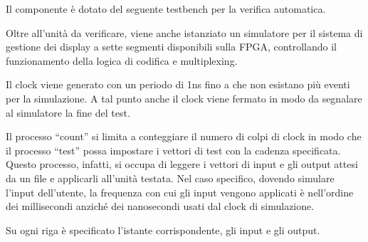 \documentclass [11pt,a4paper,oneside,draft]{article}
\begin{document}
Il componente è dotato del seguente testbench per la verifica automatica.



Oltre all'unità da verificare, viene anche istanziato un simulatore per il
sistema di gestione dei display a sette segmenti disponibili sulla FPGA,
controllando il funzionamento della logica di codifica e multiplexing.

Il clock viene generato con un periodo di 1ns fino a che non esistano più
eventi per la simulazione. A tal punto anche il clock viene fermato in 
modo da segnalare al simulatore la fine del test.

Il processo ``count'' si limita a conteggiare il numero di colpi di clock
in modo che il processo ``test'' possa impostare i vettori di test con 
la cadenza specificata. Questo processo, infatti, si occupa di leggere
i vettori di input e gli output attesi da un file e applicarli all'unità
testata. Nel caso specifico, dovendo simulare l'input dell'utente, la
frequenza con cui gli input vengono applicati è nell'ordine dei 
millisecondi anziché dei nanosecondi usati dal clock di simulazione.



Su ogni riga è specificato l'istante corrispondente, gli input e gli
output.
\end{document}
